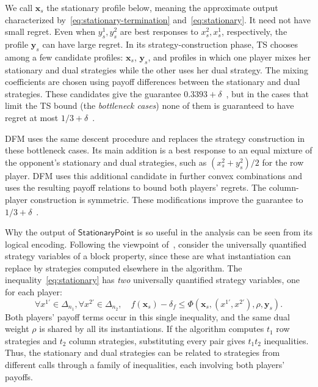 \documentclass[11pt]{article}
\theoremstyle{remark}
\theoremstyle{plain}
\newcommand{\spoint}{\mathsf{StationaryPoint}}
\begin{document}
We call $\boldsymbol x_s$ the stationary profile below, meaning the
approximate output characterized by~\eqref{eq:stationary-termination}
and~\eqref{eq:stationary}. It need not have small regret. Even when
$y_s^1,y_s^2$ are best responses to $x_s^2,x_s^1$, respectively,
the profile $\boldsymbol{y}_s$ can have large regret. In its
strategy-construction phase, TS chooses among a few candidate
profiles: $\boldsymbol{x}_s$, $\boldsymbol{y}_s$, and profiles in which one player mixes
her stationary and dual strategies while the other uses her dual
strategy. The mixing
coefficients are chosen using payoff differences between the stationary
and dual strategies. These candidates give the guarantee
$0.3393+\delta$~\cite{ts2008}, but in the cases that limit the TS
bound (the \emph{bottleneck cases}) none of them is guaranteed to
have regret at most $1/3+\delta$~\cite{dfm2023}.

DFM uses the same descent procedure and replaces the strategy construction
in these bottleneck cases. Its main addition is a best response to an
equal mixture of the opponent's stationary and dual strategies, such as
$(x_s^2+y_s^2)/2$ for the row player. DFM uses this additional candidate
in further convex combinations and uses the resulting
payoff relations to bound both players' regrets. The column-player
construction is symmetric. These modifications improve the guarantee
to $1/3+\delta$~\cite{dfm2023}.

Why the output of $\spoint$ is so useful in the analysis can be seen
from its logical encoding. Following the viewpoint
of~\cite{computeraided2026}, consider the universally quantified
strategy variables of a block property, since these are what
instantiation can replace by strategies computed elsewhere in the
algorithm.
The inequality~\eqref{eq:stationary} has \emph{two} universally
quantified strategy variables, one for each player:
\[
 \forall x^{1\prime}\in\Delta_{n_1},
 \forall x^{2\prime}\in\Delta_{n_2},\quad
 f(\boldsymbol{x}_s)-\delta_f\le
 \Phi(\boldsymbol{x}_s,(x^{1\prime},x^{2\prime}),\rho,\boldsymbol{y}_s).
\]
Both players' payoff terms occur in this single inequality, and the
same dual weight $\rho$ is shared by all its instantiations. If the
algorithm computes $t_1$ row strategies and $t_2$ column strategies,
substituting every pair gives $t_1t_2$ inequalities. Thus, the stationary
and dual strategies can be related to strategies from different calls
through a family of inequalities, each involving both players'
payoffs.
\end{document}
